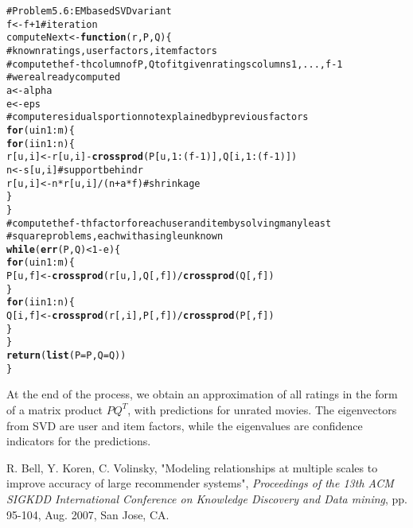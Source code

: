 \documentclass{article}\usepackage{graphicx, color}
\makeatletter
\newcommand{\hlfunctioncall}[1]{\textcolor[rgb]{0.501960784313725,0,0.329411764705882}{\textbf{#1}}}%
\newcommand{\hlcomment}[1]{\textcolor[rgb]{0.180392156862745,0.6,0.341176470588235}{#1}}%
\newenvironment{kframe}{%
 \def\at@end@of@kframe{}%
 \ifinner\ifhmode%
  \def\at@end@of@kframe{\end{minipage}}%
  \begin{minipage}{\columnwidth}%
 \fi\fi%
 \def\FrameCommand##1{\hskip\@totalleftmargin \hskip-\fboxsep
 \colorbox{shadecolor}{##1}\hskip-\fboxsep
     \hskip-\linewidth \hskip-\@totalleftmargin \hskip\columnwidth}%
 \MakeFramed {\advance\hsize-\width
   \@totalleftmargin\z@ \linewidth\hsize
   \@setminipage}}%
 {\par\unskip\endMakeFramed%
 \at@end@of@kframe}
\newenvironment{knitrout}{}{} %
\makeatother
\begin{document}
\begin{knitrout}
\color{fgcolor}\begin{kframe}
\begin{alltt}
\hlcomment{# Problem 5.6: EM based SVD variant}
f <- f + 1  \hlcomment{# iteration}
computeNext <- \hlfunctioncall{function}(r, P, Q) \{
\hlcomment{    #known ratings, user factors, item factors}
\hlcomment{    # compute the f-th column of P,Q to fit given ratings columns 1,...,f-1}
\hlcomment{    # were already computed}
    a <- alpha
    e <- eps
\hlcomment{    # compute residuals portion not explained by previous factors}
    \hlfunctioncall{for} (u in 1:m) \{
        \hlfunctioncall{for} (i in 1:n) \{
            r[u, i] <- r[u, i] - \hlfunctioncall{crossprod}(P[u, 1:(f - 1)], Q[i, 1:(f - 1)])
            n <- s[u, i]  \hlcomment{# support behind r}
            r[u, i] <- n * r[u, i]/(n + a * f)  \hlcomment{#shrinkage}
        \}
    \}
\hlcomment{    # compute the f-th factor for each user and item by solving many least}
\hlcomment{    # square problems, each with a single unknown}
    \hlfunctioncall{while} (\hlfunctioncall{err}(P, Q) < 1 - e) \{
        \hlfunctioncall{for} (u in 1:m) \{
            P[u, f] <- \hlfunctioncall{crossprod}(r[u, ], Q[, f])/\hlfunctioncall{crossprod}(Q[, f])
        \}
        \hlfunctioncall{for} (i in 1:n) \{
            Q[i, f] <- \hlfunctioncall{crossprod}(r[, i], P[, f])/\hlfunctioncall{crossprod}(P[, f])
        \}
    \}
    \hlfunctioncall{return}(\hlfunctioncall{list}(P = P, Q = Q))
\}
\end{alltt}
\end{kframe}
\end{knitrout}


At the end of the process, we obtain an approximation of all ratings in the form of a matrix product
$PQ^T$, with predictions for unrated movies. The eigenvectors from SVD are user and item factors, while
the eigenvalues are confidence indicators for the predictions.

\begin{thebibliography}{9}
 R. Bell, Y. Koren, C. Volinsky, 
"Modeling relationships at multiple scales to improve accuracy of large recommender systems",
\textit{Proceedings of the 13th ACM SIGKDD International Conference on Knowledge Discovery and Data mining},
pp. 95-104, Aug. 2007, San Jose, CA.
\end{thebibliography}
\end{document}
